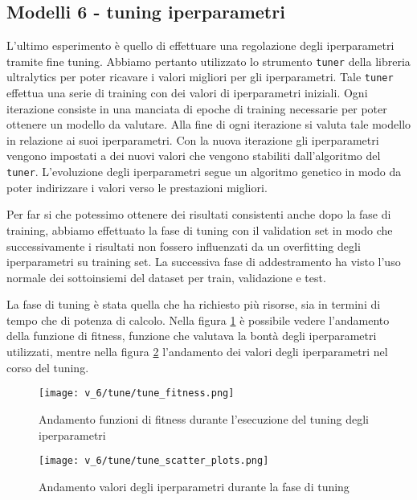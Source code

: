 \subsection*{Modelli 6 - tuning iperparametri}

L'ultimo esperimento è quello di effettuare una regolazione degli iperparametri tramite 
fine tuning. Abbiamo pertanto utilizzato lo strumento \texttt{tuner} della libreria ultralytics
per poter ricavare i valori migliori per gli iperparametri. Tale \texttt{tuner} effettua una serie 
di training con dei valori di iperparametri iniziali. Ogni iterazione consiste in una manciata
di epoche  di training necessarie per poter ottenere un modello da valutare. Alla fine di ogni 
iterazione si valuta tale modello in relazione ai suoi iperparametri. Con la nuova iterazione 
gli iperparametri vengono impostati a dei nuovi valori che vengono stabiliti dall'algoritmo del
\texttt{tuner}. L'evoluzione degli iperparametri segue un algoritmo genetico in modo da poter 
indirizzare i valori verso le prestazioni migliori.

Per far si che potessimo ottenere dei risultati consistenti anche dopo la fase di training, 
abbiamo effettuato la fase di tuning con il validation set in modo che successivamente i 
risultati non fossero influenzati da un overfitting degli iperparametri su training set.
La successiva fase di addestramento ha visto l'uso normale dei sottoinsiemi del dataset per 
train, validazione e test.

La fase di tuning è stata quella che ha richiesto più risorse, sia in termini di tempo che di 
potenza di calcolo. Nella figura \ref{fig:v6-1} è possibile vedere l'andamento della funzione 
di fitness, funzione che valutava la bontà degli iperparametri utilizzati, mentre nella figura 
\ref{fig:v6-2} l'andamento dei valori degli iperparametri nel corso del tuning. 

\begin{figure}[!htb]
    \centering
    \texttt{[image: v\_6/tune/tune\_fitness.png]}
    \caption{Andamento funzioni di fitness durante l'esecuzione del tuning degli iperparametri}
    \label{fig:v6-1}
\end{figure}

\begin{figure}[!htb]
    \centering
    \texttt{[image: v\_6/tune/tune\_scatter\_plots.png]}
    \caption{Andamento valori degli iperparametri durante la fase di tuning}
    \label{fig:v6-2}
\end{figure}


